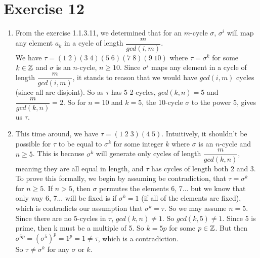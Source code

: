 \documentclass[12pt]{article}
\begin{document}
    \section*{Exercise 12}
    \begin{enumerate}[label=\textbf{\alph*.}]
        \item 
            From the exercise 1.1.3.11, we determined that for an
            $m$-cycle $\sigma$, $\sigma^i$ will map any element $a_k$ 
            in a cycle of length $\dfrac{m}{gcd(i, m)}$. \\
            We have $\tau = (1\;2)(3\;4)(5\;6)(7\;8)(9\;10)$
            where $\tau = \sigma^k$ for some $k \in \mathbb{Z}$
            and $\sigma$ is an $n$-cycle, $n \geqslant 10$.
            Since $\sigma^i$ maps any element in a cycle of length
            $\dfrac{m}{gcd(i, m)}$,
            it stands to reason that we would have $gcd(i, m)$ cycles
            (since all are disjoint).
            So as $\tau$ has 5 2-cycles, $gcd(k, n) = 5$
            and $\dfrac{m}{gcd(k, n)} = 2$. So for $n = 10$ and $k = 5$,
            the 10-cycle $\sigma$ to the power 5, gives us $\tau$.
        \item
            This time around, we have $\tau = (1\;2\;3)(4\;5)$.
            Intuitively, it shouldn't be possible for $\tau$ to be
            equal to $\sigma^k$ for some integer $k$
            where $\sigma$ is an $n$-cycle and $n \geqslant 5$.
            This is because $\sigma^k$
            will generate only cycles of length $\dfrac{m}{gcd(k, n)}$,
            meaning they are all equal in length,
            and $\tau$ has cycles of length both 2 and 3.
            To prove this formally, 
            we begin by assuming be contradiction, that $\tau = \sigma^k$
            for $n \geqslant 5$.
            If $n > 5$, then $\sigma$ permutes the elements 6, 7...
            but we know that only way 6, 7... will be fixed is
            if $\sigma^k = 1$ (if all of the elements are fixed),
            which is contradicts our assumption that $\sigma^k = \tau$.
            So we may assume $n = 5$.
            Since there are no 5-cycles in $\tau$,
            $gcd(k, n) \neq 1$. So $gcd(k, 5) \neq 1$.
            Since 5 is prime, then k must be a multiple of 5.
            So $k = 5p$ for some $p \in \mathbb{Z}$.
            But then $\sigma^{5p} = (\sigma^5)^p = 1^p = 1 \neq \tau$,
            which is a contradiction. \\
            So $\tau \neq \sigma^k$ for any $\sigma$ or $k$.
    \end{enumerate}
\end{document}
